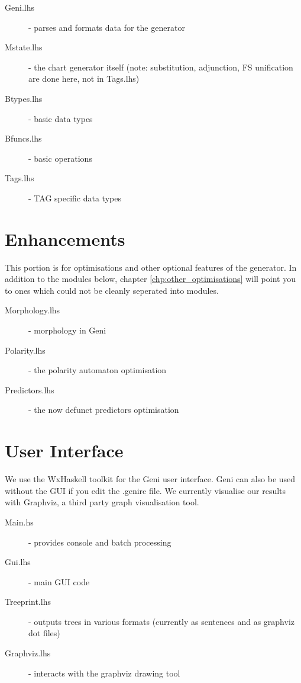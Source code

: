 \documentclass[a4paper,11pt]{report}
\begin{document}
\begin{description}
 \item[Geni.lhs] - parses and formats data for the generator 
 \item[Mstate.lhs] - the chart generator itself (note: substitution,
 adjunction, FS unification are done here, not in Tags.lhs)
 \item[Btypes.lhs] - basic data types 
 \item[Bfuncs.lhs] - basic operations 
 \item[Tags.lhs] - TAG specific data types
\end{description}

\section{Enhancements}

This portion is for optimisations and other optional features of the
generator.
In addition to the modules below, chapter \ref{chp:other_optimisations}
will point you to ones which could not be cleanly seperated into
modules.

\begin{description}
 \item[Morphology.lhs] - morphology in Geni  
 \item[Polarity.lhs] - the polarity automaton optimisation 
 \item[Predictors.lhs] - the now defunct predictors optimisation
\end{description}

\section{User Interface}

We use the WxHaskell toolkit for the Geni user interface.  Geni
can also be used without the GUI if you edit the .genirc file.
We currently visualise our results with Graphviz, a third party graph
visualisation tool.

\begin{description}
 \item[Main.hs] - provides console and batch processing 
 \item[Gui.lhs] - main GUI code 
 \item[Treeprint.lhs] - outputs trees in various formats 
                        (currently as sentences and as graphviz dot
                        files)
 \item[Graphviz.lhs] - interacts with the graphviz drawing tool
\end{description}
\end{document}
